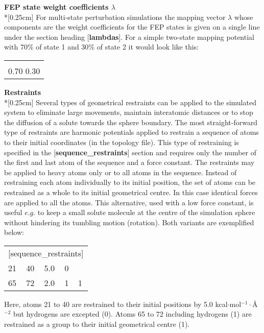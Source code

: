 \documentclass[a4paper,11pt]{article}
\begin{document}
\textbf{FEP state weight coefficients $\lambda $}\\*[0.25cm] For
multi-state perturbation simulations the mapping vector $\lambda $
whose components are the weight coefficients for the FEP states is
given on a single line under the section heading
[\textbf{lambdas}]. For a simple two-state mapping potential with
70{\%} of state 1 and 30{\%} of state 2 it would look like this:

\begin{center}
\begin{tabularx}{\textwidth}{|X|}
  \hline
  [lambdas] \\
  0.70 0.30 \\ \hline
\end{tabularx}
\end{center}

\textbf{Restraints}\\*[0.25cm] Several types of geometrical
restraints can be applied to the simulated system to eliminate
large movements, maintain interatomic distances or to stop the
diffusion of a solute towards the sphere boundary. The most
straight-forward type of restraints are harmonic potentials
applied to restrain a sequence of atoms to their initial
coordinates (in the topology file). This type of restraining is
specified in the [\textbf{sequence{\_}restraints}] section and
requires only the number of the first and last atom of the
sequence and a force constant. The restraints may be applied to
heavy atoms only or to all atoms in the sequence. Instead of
restraining each atom individually to its initial position, the
set of atoms can be restrained as a whole to its initial
geometrical centre. In this case identical forces are applied to
all the atoms. This alternative, used with a low force constant,
is useful $e.g.$ to keep a small solute molecule at the centre of
the simulation sphere without hindering its tumbling motion
(rotation). Both variants are exemplified below:

\begin{center}
\begin{tabularx}{\textwidth}{|l l l l X|}
  \hline
  \multicolumn{5}{|l|}{[sequence{\_}restraints]} \\
  21 & 40 & 5.0 & 0 & \\
  65 & 72 & 2.0 & 1 & 1 \\ \hline
\end{tabularx}
\end{center}

Here, atoms 21 to 40 are restrained to their initial positions by
5.0 kcal$\cdot $mol$^{-1}\cdot ${\AA}$^{-2}$ but hydrogens are
excepted (0). Atoms 65 to 72 including hydrogens (1) are
restrained as a group to their initial geometrical centre (1).
\end{document}

